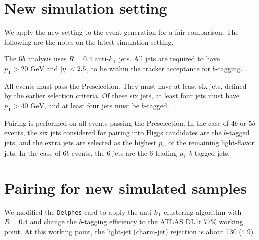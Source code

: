 \documentclass[12pt]{article}
\begin{document}
\section{New simulation setting}%
\label{sec:new_simulation_setting}
    We apply the new setting to the event generation for a fair comparison. The following are the notes on the latest simulation setting.

    The $6b$ analysis uses $R = 0.4$ anti-$k_{\text{T}}$ jets. All jets are required to have $p_{\text{T}} > 20 \text{ GeV}$ and  $\abs{\eta} < 2.5$, to be within the tracker acceptance for $b$-tagging.

    All events must pass the Preselection. They must have at least six jets, defined by the earlier selection criteria. Of these six jets, at least four jets must have $p_{\text{T}} > \text{40 GeV}$, and at least four jets must be $b$-tagged.

    Pairing is performed on all events passing the Preselection. In the case of $4b$ or $5b$ events, the six jets considered for pairing into Higgs candidates are the $b$-tagged jets, and the extra jets are selected as the highest $p_{\text{T}}$ of the remaining light-flavor jets. In the case of $6b$ events, the 6 jets are the 6 leading $p_{\text{T}}$ $b$-tagged jets.
\section{Pairing for new simulated samples}%
\label{sec:pairing_for_new_simulated_samples}
    We modified the \verb|Delphes| card to apply the anti-$k_{\text{T}}$ clustering algorithm with $R = 0.4$ and change the $b$-tagging efficiency to the ATLAS DL1r 77\% working point. At this working point, the light-jet (charm-jet) rejection is about 130 (4.9).
\end{document}
